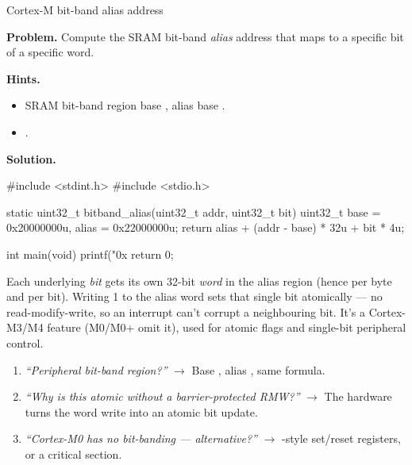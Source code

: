 \begin{gymproblem}{Cortex-M bit-band alias address}

\textbf{Problem.} Compute the SRAM bit-band \emph{alias} address that maps to a
specific bit of a specific word.

\textbf{Hints.}
\begin{itemize}
\item SRAM bit-band region base , alias base
  .
\item {}.
\end{itemize}

\attempt

\textbf{Solution.}
\begin{cgym}
#include <stdint.h>
#include <stdio.h>

static uint32_t bitband_alias(uint32_t addr, uint32_t bit) {
    uint32_t base = 0x20000000u, alias = 0x22000000u;
    return alias + (addr - base) * 32u + bit * 4u;
}

int main(void) {
    printf("0x%
    return 0;
}
\end{cgym}

Each underlying \emph{bit} gets its own 32-bit \emph{word} in the alias region
(hence  per byte and  per bit). Writing 1 to the alias word
sets that single bit atomically --- no read-modify-write, so an interrupt can't
corrupt a neighbouring bit. It's a Cortex-M3/M4 feature (M0/M0+ omit it), used
for atomic flags and single-bit peripheral control.

\followups
\begin{enumerate}
\item \emph{``Peripheral bit-band region?''} $\rightarrow$ Base
  , alias , same formula.
\item \emph{``Why is this atomic without a barrier-protected RMW?''}
  $\rightarrow$ The hardware turns the word write into an atomic bit update.
\item \emph{``Cortex-M0 has no bit-banding --- alternative?''} $\rightarrow$
  -style set/reset registers, or a critical section.
\end{enumerate}
\end{gymproblem}

